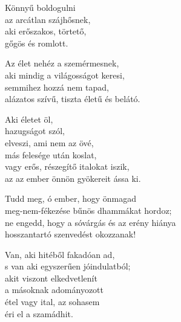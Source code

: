 \begin{dhpverse}

 Könnyű boldogulni\\
az arcátlan szájhősnek,\\
aki erőszakos, törtető,\\
gőgös és romlott.

 Az élet nehéz a szemérmesnek,\\
aki mindig a világosságot keresi,\\
semmihez hozzá nem tapad,\\
alázatos szívű, tiszta életű és belátó.

 Aki életet öl,\\
hazugságot szól,\\
elveszi, ami nem az övé,\\
más felesége után koslat,\\
vagy erős, részegítő italokat iszik,\\
az az ember önnön gyökereit ássa ki.

 Tudd meg, ó ember, hogy önmagad\\
meg-nem-fékezése bűnös dhammákat hordoz;\\
ne engedd, hogy a sóvárgás és az erény hiánya\\
hosszantartó szenvedést okozzanak!

 Van, aki hitéből fakadóan ad,\\
s van aki egyszerűen jóindulatból;\\
akit viszont elkedvetlenít\\
a másoknak adományozott\\
étel vagy ital, az sohasem\\
éri el a szamádhit.

\end{dhpverse}
\newpage
